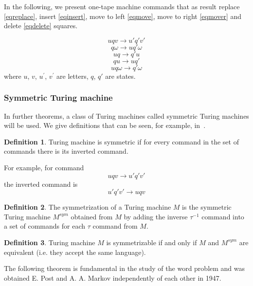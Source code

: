 \documentclass[conference]{IEEEtran}
\theoremstyle{definition}
\newtheorem{defn}{Definition}[section]
\begin{document}
In the following, we present one-tape machine commands that as result replace \eqref{eqreplace},
insert \eqref{eqinsert}, move to left \eqref{eqmove}, move to right \eqref{eqmover} and delete \eqref{eqdelete} squares.

\begin{equation}
    u q v \to u' q' v' \label{eqreplace}
\end{equation}
\begin{equation}
    q \omega \to u q' \omega \label{eqinsert}
\end{equation}
\begin{equation}
    u q \to q' u \label{eqmovel}
\end{equation}
\begin{equation}
    q u \to u q' \label{eqmover}
\end{equation}
\begin{equation}
    u q \omega \to q' \omega \label{eqdelete}
\end{equation}
where $u$, $v$, $u^{'}$, $v^{'}$ are letters, $q$, $q'$ are states.

\subsubsection{Symmetric Turing machine}

In further theorems, a class of Turing machines called symmetric Turing machines will be used. We give definitions that can be seen, for example, in~\cite{symTM}.

\begin{defn}
Turing machine is symmetric if for every command in the set of commands there
is its inverted command.
\end{defn}
For  example, for command
$$u q v \to u' q' v'$$ the inverted command is $$u' q' v' \to u q v$$

\begin{defn}
The symmetrization of a Turing machine $M$ is the symmetric Turing machine $ M^{sym} $ obtained from $M$ by adding the inverse $ \tau^{-1} $ command into a set of commands for each $ \tau $ command from $M$.
\end{defn}

\begin{defn}
Turing machine $M$ is symmetrizable if and only if
$M$ and $ M^{sym} $ are equivalent (i.e. they accept the same language).
\end{defn}

The following theorem is fundamental in the study of the word problem and was obtained
E. Post and A. A. Markov independently of each other in 1947.
\end{document}
